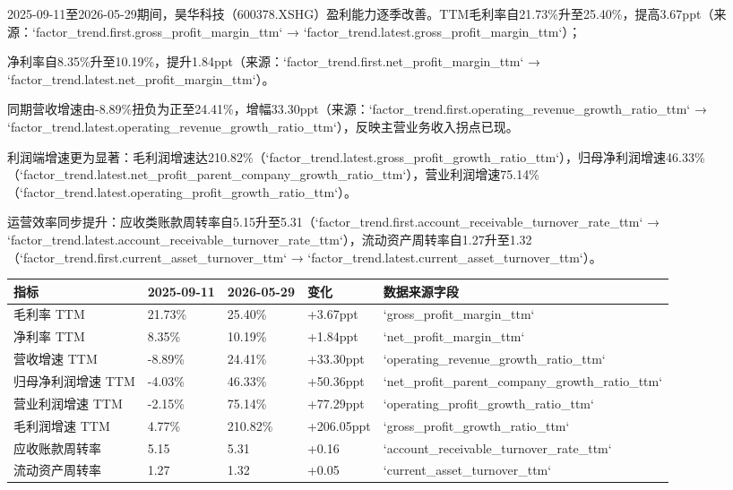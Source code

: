 \documentclass[12pt,a4paper]{article}
\begin{document}
2025-09-11至2026-05-29期间，昊华科技（600378.XSHG）盈利能力逐季改善。TTM毛利率自21.73\%升至25.40\%，提高3.67ppt（来源：`factor\_trend.first.gross\_profit\_margin\_ttm` → `factor\_trend.latest.gross\_profit\_margin\_ttm`）；

净利率自8.35\%升至10.19\%，提升1.84ppt（来源：`factor\_trend.first.net\_profit\_margin\_ttm` → `factor\_trend.latest.net\_profit\_margin\_ttm`）。

同期营收增速由-8.89\%扭负为正至24.41\%，增幅33.30ppt（来源：`factor\_trend.first.operating\_revenue\_growth\_ratio\_ttm` → `factor\_trend.latest.operating\_revenue\_growth\_ratio\_ttm`），反映主营业务收入拐点已现。

利润端增速更为显著：毛利润增速达210.82\%（`factor\_trend.latest.gross\_profit\_growth\_ratio\_ttm`），归母净利润增速46.33\%（`factor\_trend.latest.net\_profit\_parent\_company\_growth\_ratio\_ttm`），营业利润增速75.14\%（`factor\_trend.latest.operating\_profit\_growth\_ratio\_ttm`）。

运营效率同步提升：应收类账款周转率自5.15升至5.31（`factor\_trend.first.account\_receivable\_turnover\_rate\_ttm` → `factor\_trend.latest.account\_receivable\_turnover\_rate\_ttm`），流动资产周转率自1.27升至1.32（`factor\_trend.first.current\_asset\_turnover\_ttm` → `factor\_trend.latest.current\_asset\_turnover\_ttm`）。

\begin{table}[htbp]
\centering
\begin{tabular}{lllll}
\toprule
指标 & 2025-09-11 & 2026-05-29 & 变化 & 数据来源字段 \\
\midrule
毛利率 TTM & 21.73\% & 25.40\% & +3.67ppt & `gross\_profit\_margin\_ttm` \\
净利率 TTM & 8.35\% & 10.19\% & +1.84ppt & `net\_profit\_margin\_ttm` \\
营收增速 TTM & -8.89\% & 24.41\% & +33.30ppt & `operating\_revenue\_growth\_ratio\_ttm` \\
归母净利润增速 TTM & -4.03\% & 46.33\% & +50.36ppt & `net\_profit\_parent\_company\_growth\_ratio\_ttm` \\
营业利润增速 TTM & -2.15\% & 75.14\% & +77.29ppt & `operating\_profit\_growth\_ratio\_ttm` \\
毛利润增速 TTM & 4.77\% & 210.82\% & +206.05ppt & `gross\_profit\_growth\_ratio\_ttm` \\
应收账款周转率 & 5.15 & 5.31 & +0.16 & `account\_receivable\_turnover\_rate\_ttm` \\
流动资产周转率 & 1.27 & 1.32 & +0.05 & `current\_asset\_turnover\_ttm` \\
\bottomrule
\end{tabular}
\end{table}
\end{document}
